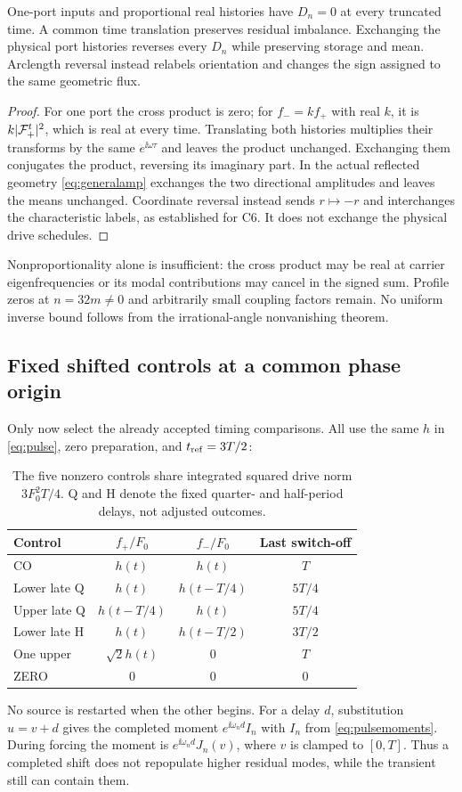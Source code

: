 \begin{corollary}\label{cor:temporalzeros}
One-port inputs and proportional real histories have $D_n=0$ at every truncated time. A common time translation preserves residual imbalance. Exchanging the physical port histories reverses every $D_n$ while preserving storage and mean. Arclength reversal instead relabels orientation and changes the sign assigned to the same geometric flux.
\end{corollary}
\begin{proof}
For one port the cross product is zero; for $f_-=kf_+$ with real $k$, it is $k|\mathcal F_+^t|^2$, which is real at every time. Translating both histories multiplies their transforms by the same $e^{\ii\omega\tau}$ and leaves the product unchanged. Exchanging them conjugates the product, reversing its imaginary part. In the actual reflected geometry \eqref{eq:generalamp} exchanges the two directional amplitudes and leaves the means unchanged. Coordinate reversal instead sends $r\mapsto-r$ and interchanges the characteristic labels, as established for C6. It does not exchange the physical drive schedules.
\end{proof}

Nonproportionality alone is insufficient: the cross product may be real at carrier eigenfrequencies or its modal contributions may cancel in the signed sum. Profile zeros at $n=32m\ne0$ and arbitrarily small coupling factors remain. No uniform inverse bound follows from the irrational-angle nonvanishing theorem.

\subsection{Fixed shifted controls at a common phase origin}
Only now select the already accepted timing comparisons. All use the same $h$ in \eqref{eq:pulse}, zero preparation, and $t_{\mathrm{ref}}=3T/2$:
\begin{table}[htbp]\centering\small
\begin{tabular}{lccc}\toprule
Control & $f_+/F_0$ & $f_-/F_0$ & Last switch-off\\\midrule
CO &$h(t)$&$h(t)$&$T$\\
Lower late Q &$h(t)$&$h(t-T/4)$&$5T/4$\\
Upper late Q &$h(t-T/4)$&$h(t)$&$5T/4$\\
Lower late H &$h(t)$&$h(t-T/2)$&$3T/2$\\
One upper &$\sqrt2h(t)$&$0$&$T$\\
ZERO &$0$&$0$&$0$\\\bottomrule
\end{tabular}
\caption{The five nonzero controls share integrated squared drive norm $3F_0^2T/4$. Q and H denote the fixed quarter- and half-period delays, not adjusted outcomes.}\label{tab:schedules}
\end{table}
No source is restarted when the other begins. For a delay $d$, substitution $u=v+d$ gives the completed moment $e^{\ii\omega_nd}I_n$ with $I_n$ from \eqref{eq:pulsemoments}. During forcing the moment is $e^{\ii\omega_nd}J_n(v)$, where $v$ is clamped to $[0,T]$. Thus a completed shift does not repopulate higher residual modes, while the transient still can contain them.

